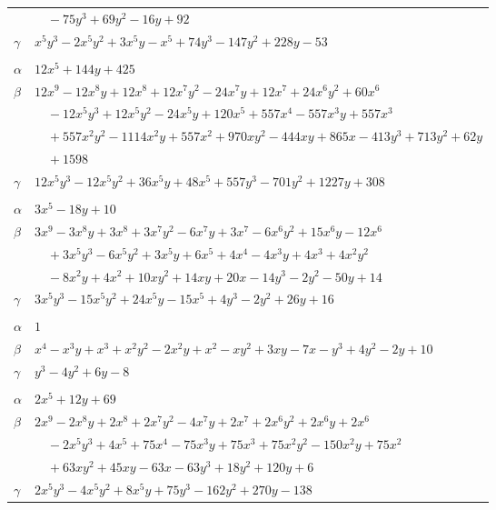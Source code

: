 \documentclass[11pt]{article}
\begin{document}
\begin{longtable}{@{}ll@{}}
 & $\quad -75y^{3}+69y^{2}-16y+92$\\
$\gamma$ & $x^{5}y^{3}-2x^{5}y^{2}+3x^{5}y-x^{5}+74y^{3}-147y^{2}+228y-53$\\
\addlinespace[3pt]
\multicolumn{2}{@{}l}{$\{i,j\}=\{8,27\}$, $k_{ij}=7\cdot 17^{2}$}\\
$\alpha$ & $12x^{5}+144y+425$\\
$\beta$ & $12x^{9}-12x^{8}y+12x^{8}+12x^{7}y^{2}-24x^{7}y+12x^{7}+24x^{6}y^{2}+60x^{6}$\\
 & $\quad -12x^{5}y^{3}+12x^{5}y^{2}-24x^{5}y+120x^{5}+557x^{4}-557x^{3}y+557x^{3}$\\
 & $\quad +557x^{2}y^{2}-1114x^{2}y+557x^{2}+970xy^{2}-444xy+865x-413y^{3}+713y^{2}+62y$\\
 & $\quad +1598$\\
$\gamma$ & $12x^{5}y^{3}-12x^{5}y^{2}+36x^{5}y+48x^{5}+557y^{3}-701y^{2}+1227y+308$\\
\addlinespace[3pt]
\multicolumn{2}{@{}l}{$\{i,j\}=\{8,30\}$, $k_{ij}=2^{3}\cdot 5$}\\
$\alpha$ & $3x^{5}-18y+10$\\
$\beta$ & $3x^{9}-3x^{8}y+3x^{8}+3x^{7}y^{2}-6x^{7}y+3x^{7}-6x^{6}y^{2}+15x^{6}y-12x^{6}$\\
 & $\quad +3x^{5}y^{3}-6x^{5}y^{2}+3x^{5}y+6x^{5}+4x^{4}-4x^{3}y+4x^{3}+4x^{2}y^{2}$\\
 & $\quad -8x^{2}y+4x^{2}+10xy^{2}+14xy+20x-14y^{3}-2y^{2}-50y+14$\\
$\gamma$ & $3x^{5}y^{3}-15x^{5}y^{2}+24x^{5}y-15x^{5}+4y^{3}-2y^{2}+26y+16$\\
\addlinespace[3pt]
\multicolumn{2}{@{}l}{$\{i,j\}=\{8,34\}$, $k_{ij}=11$}\\
$\alpha$ & $1$\\
$\beta$ & $x^{4}-x^{3}y+x^{3}+x^{2}y^{2}-2x^{2}y+x^{2}-xy^{2}+3xy-7x-y^{3}+4y^{2}-2y+10$\\
$\gamma$ & $y^{3}-4y^{2}+6y-8$\\
\addlinespace[3pt]
\multicolumn{2}{@{}l}{$\{i,j\}=\{8,37\}$, $k_{ij}=3^{3}\cdot 13$}\\
$\alpha$ & $2x^{5}+12y+69$\\
$\beta$ & $2x^{9}-2x^{8}y+2x^{8}+2x^{7}y^{2}-4x^{7}y+2x^{7}+2x^{6}y^{2}+2x^{6}y+2x^{6}$\\
 & $\quad -2x^{5}y^{3}+4x^{5}+75x^{4}-75x^{3}y+75x^{3}+75x^{2}y^{2}-150x^{2}y+75x^{2}$\\
 & $\quad +63xy^{2}+45xy-63x-63y^{3}+18y^{2}+120y+6$\\
$\gamma$ & $2x^{5}y^{3}-4x^{5}y^{2}+8x^{5}y+75y^{3}-162y^{2}+270y-138$\\

\end{longtable}
\end{document}
